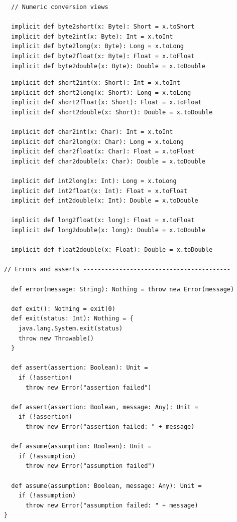 {\begin{lstlisting}
  // Numeric conversion views

  implicit def byte2short(x: Byte): Short = x.toShort
  implicit def byte2int(x: Byte): Int = x.toInt
  implicit def byte2long(x: Byte): Long = x.toLong
  implicit def byte2float(x: Byte): Float = x.toFloat
  implicit def byte2double(x: Byte): Double = x.toDouble

\end{lstlisting}
\newpage
\begin{lstlisting}
  implicit def short2int(x: Short): Int = x.toInt
  implicit def short2long(x: Short): Long = x.toLong
  implicit def short2float(x: Short): Float = x.toFloat
  implicit def short2double(x: Short): Double = x.toDouble

  implicit def char2int(x: Char): Int = x.toInt
  implicit def char2long(x: Char): Long = x.toLong
  implicit def char2float(x: Char): Float = x.toFloat
  implicit def char2double(x: Char): Double = x.toDouble

  implicit def int2long(x: Int): Long = x.toLong
  implicit def int2float(x: Int): Float = x.toFloat
  implicit def int2double(x: Int): Double = x.toDouble

  implicit def long2float(x: long): Float = x.toFloat
  implicit def long2double(x: long): Double = x.toDouble

  implicit def float2double(x: Float): Double = x.toDouble

// Errors and asserts -----------------------------------------

  def error(message: String): Nothing = throw new Error(message)

  def exit(): Nothing = exit(0)
  def exit(status: Int): Nothing = {
    java.lang.System.exit(status)
    throw new Throwable()
  }

  def assert(assertion: Boolean): Unit =
    if (!assertion)
      throw new Error("assertion failed")

  def assert(assertion: Boolean, message: Any): Unit =
    if (!assertion)
      throw new Error("assertion failed: " + message)

  def assume(assumption: Boolean): Unit =
    if (!assumption)
      throw new Error("assumption failed")

  def assume(assumption: Boolean, message: Any): Unit =
    if (!assumption)
      throw new Error("assumption failed: " + message)
}
\end{lstlisting}

}

